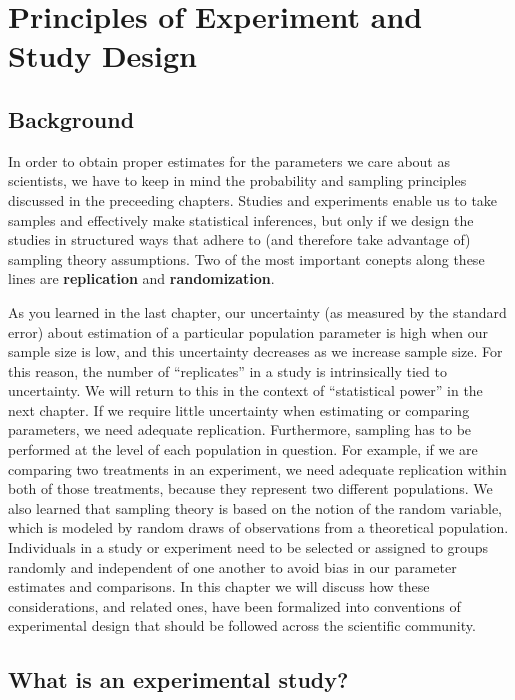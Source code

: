 \documentclass[]{book}
\begin{document}
\hypertarget{principles-of-experiment-and-study-design}{%
\chapter{Principles of Experiment and Study Design}\label{principles-of-experiment-and-study-design}}

\hypertarget{background-4}{%
\section{Background}\label{background-4}}

In order to obtain proper estimates for the parameters we care about as scientists, we have to keep in mind the probability and sampling principles discussed in the preceeding chapters. Studies and experiments enable us to take samples and effectively make statistical inferences, but only if we design the studies in structured ways that adhere to (and therefore take advantage of) sampling theory assumptions. Two of the most important conepts along these lines are \textbf{replication} and \textbf{randomization}.

As you learned in the last chapter, our uncertainty (as measured by the standard error) about estimation of a particular population parameter is high when our sample size is low, and this uncertainty decreases as we increase sample size. For this reason, the number of ``replicates'' in a study is intrinsically tied to uncertainty. We will return to this in the context of ``statistical power'' in the next chapter. If we require little uncertainty when estimating or comparing parameters, we need adequate replication. Furthermore, sampling has to be performed at the level of each population in question. For example, if we are comparing two treatments in an experiment, we need adequate replication within both of those treatments, because they represent two different populations. We also learned that sampling theory is based on the notion of the random variable, which is modeled by random draws of observations from a theoretical population. Individuals in a study or experiment need to be selected or assigned to groups randomly and independent of one another to avoid bias in our parameter estimates and comparisons. In this chapter we will discuss how these considerations, and related ones, have been formalized into conventions of experimental design that should be followed across the scientific community.

\hypertarget{what-is-an-experimental-study}{%
\section{What is an experimental study?}\label{what-is-an-experimental-study}}
\end{document}
